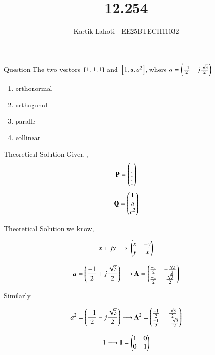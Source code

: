 \documentclass{beamer}
\title %
{12.254}
\author 
{Kartik Lahoti - EE25BTECH11032}
\begin{document}
\frame{\titlepage}
\begin{frame}{Question}
The two vectors ${}\left[1,1,1\right]$ and ${}\left[1,a,a^2\right]$, where $a = \left(\frac{-1}{2} + j\frac{\sqrt{3}}{2}\right)$

\begin{multicols}
\begin{enumerate}
    \item orthonormal
        \item orthogonal
        \item paralle
        \item collinear
\end{enumerate}
\end{multicols}

\end{frame}

\begin{frame}{Theoretical Solution}
Given , 
\begin{align}
    \mathbf{P} = \begin{pmatrix}1\\1\\1\end{pmatrix} 
\end{align}
\begin{align}
    \mathbf{Q} = \begin{pmatrix}1\\a\\a^2\end{pmatrix} 
\end{align}
\end{frame}

\begin{frame}{Theoretical Solution}
we know, 

\begin{align}
    x+jy \longrightarrow{} \begin{pmatrix}x & -y \\ y & x \end{pmatrix}
\end{align}

\begin{align}
    a = \left(\frac{-1}{2} + j\frac{\sqrt{3}}{2}\right) \longrightarrow \mathbf{A} = \begin{pmatrix}\frac{-1}{2}&-\frac{\sqrt{3}}{2}\\\frac{-1}{2} & \frac{\sqrt{3}}{2}\end{pmatrix}
\end{align}

Similarly 

\begin{align}
    a^2 = \left(\frac{-1}{2} - j\frac{\sqrt{3}}{2}\right) \longrightarrow \mathbf{A}^2 = \begin{pmatrix}\frac{-1}{2}&\frac{\sqrt{3}}{2}\\\frac{-1}{2} & -\frac{\sqrt{3}}{2}\end{pmatrix}
\end{align}

\begin{align}
    1 \longrightarrow \mathbf{I} = \begin{pmatrix}1&0\\0&1\end{pmatrix}
\end{align}
\end{frame}
\end{document}
